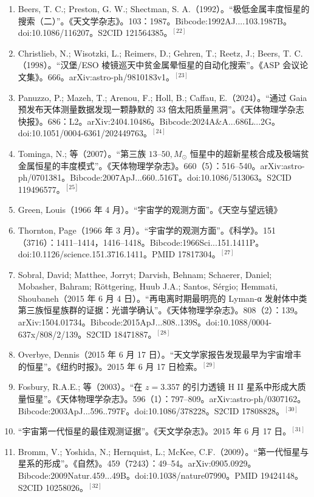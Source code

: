 \begin{enumerate}
\item Beers, T. C.; Preston, G. W.; Shectman, S. A.（1992）。“极低金属丰度恒星的搜索（二）”。《天文学杂志》。103：1987。Bibcode:1992AJ....103.1987B。doi:10.1086/116207。S2CID 121564385。$^{[22]}$
\item Christlieb, N.; Wisotzki, L.; Reimers, D.; Gehren, T.; Reetz, J.; Beers, T. C.（1998）。“汉堡/ESO 棱镜巡天中贫金属晕恒星的自动化搜索”。《ASP 会议论文集》。666。arXiv:astro-ph/9810183v1。$^{[23]}$
\item Panuzzo, P.; Mazeh, T.; Arenou, F.; Holl, B.; Caffau, E.（2024）。“通过 Gaia 预发布天体测量数据发现一颗静默的 33 倍太阳质量黑洞”。《天体物理学杂志快报》。686：L2。arXiv:2404.10486。Bibcode:2024A&A...686L...2G。doi:10.1051/0004-6361/202449763。$^{[24]}$
\item Tominga, N.; 等（2007）。“第三族 $13$–$50,M_\odot$ 恒星中的超新星核合成及极端贫金属恒星的丰度模式”。《天体物理学杂志》。660（5）：516–540。arXiv:astro-ph/0701381。Bibcode:2007ApJ...660..516T。doi:10.1086/513063。S2CID 119496577。$^{[25]}$
\item Green, Louis（1966 年 4 月）。“宇宙学的观测方面”。《天空与望远镜》
\item Thornton, Page（1966 年 3 月）。“宇宙学的观测方面”。《科学》。151（3716）：1411–1414，1416–1418。Bibcode:1966Sci...151.1411P。doi:10.1126/science.151.3716.1411。PMID 17817304。$^{[27]}$
\item Sobral, David; Matthee, Jorryt; Darvish, Behnam; Schaerer, Daniel; Mobasher, Bahram; Röttgering, Huub J.A.; Santos, Sérgio; Hemmati, Shoubaneh（2015 年 6 月 4 日）。“再电离时期最明亮的 Lyman-α 发射体中类第三族恒星族群的证据：光谱学确认”。《天体物理学杂志》。808（2）：139。arXiv:1504.01734。Bibcode:2015ApJ...808..139S。doi:10.1088/0004-637x/808/2/139。S2CID 18471887。$^{[28]}$
\item Overbye, Dennis（2015 年 6 月 17 日）。“天文学家报告发现最早为宇宙增丰的恒星”。《纽约时报》。2015 年 6 月 17 日检索。$^{[29]}$
\item Fosbury, R.A.E.; 等（2003）。“在 $z=3.357$ 的引力透镜 H II 星系中形成大质量恒星”。《天体物理学杂志》。596（1）：797–809。arXiv:astro-ph/0307162。Bibcode:2003ApJ...596..797F。doi:10.1086/378228。S2CID 17808828。$^{[30]}$
\item “宇宙第一代恒星的最佳观测证据”。《天文学杂志》。2015 年 6 月 17 日。$^{[31]}$
\item Bromm, V.; Yoshida, N.; Hernquist, L.; McKee, C.F.（2009）。“第一代恒星与星系的形成”。《自然》。459（7243）：49–54。arXiv:0905.0929。Bibcode:2009Natur.459...49B。doi:10.1038/nature07990。PMID 19424148。S2CID 10258026。$^{[32]}$

\end{enumerate}
